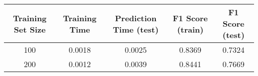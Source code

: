 \documentclass{ctexart}
\begin{document}
\begin{longtable}[]{@{}ccccc@{}}
\toprule
\begin{minipage}[b]{0.16\columnwidth}\centering\strut
Training Set Size\strut
\end{minipage} & \begin{minipage}[b]{0.21\columnwidth}\centering\strut
Training Time\strut
\end{minipage} & \begin{minipage}[b]{0.20\columnwidth}\centering\strut
Prediction Time (test)\strut
\end{minipage} & \begin{minipage}[b]{0.15\columnwidth}\centering\strut
F1 Score (train)\strut
\end{minipage} & \begin{minipage}[b]{0.14\columnwidth}\centering\strut
F1 Score (test)\strut
\end{minipage}\tabularnewline
\midrule
\endhead
\begin{minipage}[t]{0.16\columnwidth}\centering\strut
100\strut
\end{minipage} & \begin{minipage}[t]{0.21\columnwidth}\centering\strut
0.0018\strut
\end{minipage} & \begin{minipage}[t]{0.20\columnwidth}\centering\strut
0.0025\strut
\end{minipage} & \begin{minipage}[t]{0.15\columnwidth}\centering\strut
0.8369\strut
\end{minipage} & \begin{minipage}[t]{0.14\columnwidth}\centering\strut
0.7324\strut
\end{minipage}\tabularnewline
\begin{minipage}[t]{0.16\columnwidth}\centering\strut
200\strut
\end{minipage} & \begin{minipage}[t]{0.21\columnwidth}\centering\strut
0.0012\strut
\end{minipage} & \begin{minipage}[t]{0.20\columnwidth}\centering\strut
0.0039\strut
\end{minipage} & \begin{minipage}[t]{0.15\columnwidth}\centering\strut
0.8441\strut
\end{minipage} & \begin{minipage}[t]{0.14\columnwidth}\centering\strut
0.7669\strut
\end{minipage}\tabularnewline

\end{longtable}
\end{document}
